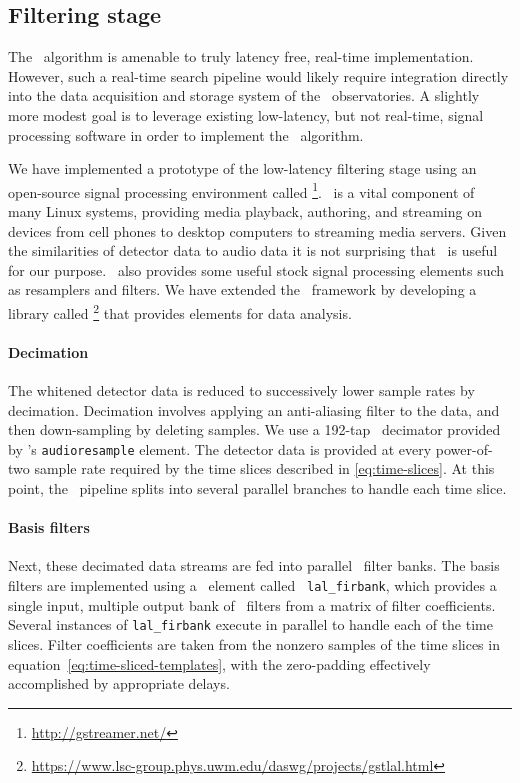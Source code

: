 \subsection{Filtering stage}

The \lloid\ algorithm is amenable to truly latency free, real-time implementation.
However, such a real-time search pipeline would likely require integration directly into
the data acquisition and storage system of the \LIGO\ observatories.  A slightly more 
modest goal is to leverage existing low-latency, but not real-time, signal processing
software in order to implement the \lloid\ algorithm.

We have implemented a prototype of the low-latency filtering stage using an
open-source signal processing environment called
\gstreamer\footnote{\url{http://gstreamer.net/}}.
\gstreamer\ is a vital component of many Linux systems, providing media
playback, authoring, and streaming on devices from cell phones to desktop
computers to streaming media servers.  Given the similarities of
\GW{} detector data to audio data it is not surprising that
\gstreamer\ is useful for our purpose. \gstreamer\ also provides some useful
stock signal processing elements such as resamplers and filters.  We have
extended the \gstreamer\ framework by developing a library called
\gstlal\footnote{\url{https://www.lsc-group.phys.uwm.edu/daswg/projects/gstlal.html}}
that provides elements for \GW{} data analysis.

\paragraph{Decimation}

The whitened detector data is reduced to successively
lower sample rates by decimation. Decimation involves applying an anti-aliasing
filter to the data, and then down-sampling by deleting samples.  We use a
192-tap \fir\ decimator provided by \gstreamer{}'s {\tt audioresample}
element.  The detector data is provided at every power-of-two sample rate
required by the time slices described in \eqref{eq:time-slices}.  At this point,
the \gstreamer\ pipeline splits into several parallel branches to handle each
time slice.

\paragraph{Basis filters}

Next, these decimated data streams are fed into parallel \fir\ filter banks.
The basis filters are implemented using a \gstlal\ element called {\tt
lal\_firbank}, which provides a single input, multiple output bank of \fir\ filters
from a matrix of filter coefficients.  Several instances of {\tt lal\_firbank}
execute in parallel to handle each of the time slices.  Filter coefficients are taken
from the nonzero samples of the time slices in equation~\eqref{eq:time-sliced-templates},
with the zero-padding effectively accomplished by appropriate delays.

